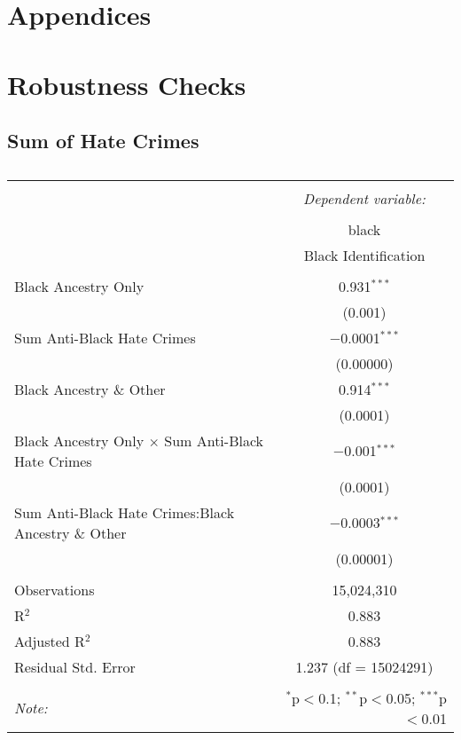 \documentclass{article}
\begin{document}
\newpage

\section*{Appendices}
\appendix

\section{Robustness Checks}
\subsection{Sum of Hate Crimes}
    \begin{table}[!htbp] \centering 
      \caption{} 
      \label{} 
    \begin{tabular}{@{\extracolsep{5pt}}lc} 
    \\[-1.8ex]\hline 
    \hline \\[-1.8ex] 
     & \multicolumn{1}{c}{\textit{Dependent variable:}} \\ 
    \cline{2-2} 
    \\[-1.8ex] & black \\ 
     & Black Identification \\ 
    \hline \\[-1.8ex] 
     Black Ancestry Only & 0.931$^{***}$ \\ 
      & (0.001) \\ 
     Sum Anti-Black Hate Crimes & $-$0.0001$^{***}$ \\ 
      & (0.00000) \\ 
     Black Ancestry \& Other & 0.914$^{***}$ \\ 
      & (0.0001) \\ 
     Black Ancestry Only $\times$ Sum Anti-Black Hate Crimes & $-$0.001$^{***}$ \\ 
      & (0.0001) \\ 
     Sum Anti-Black Hate Crimes:Black Ancestry \& Other & $-$0.0003$^{***}$ \\ 
      & (0.00001) \\ 
    \hline \\[-1.8ex] 
    Observations & 15,024,310 \\ 
    R$^{2}$ & 0.883 \\ 
    Adjusted R$^{2}$ & 0.883 \\ 
    Residual Std. Error & 1.237 (df = 15024291) \\ 
    \hline 
    \hline \\[-1.8ex] 
    \textit{Note:}  & \multicolumn{1}{r}{$^{*}$p$<$0.1; $^{**}$p$<$0.05; $^{***}$p$<$0.01} \\ 
    \end{tabular} 
    \end{table} 
\end{document}
